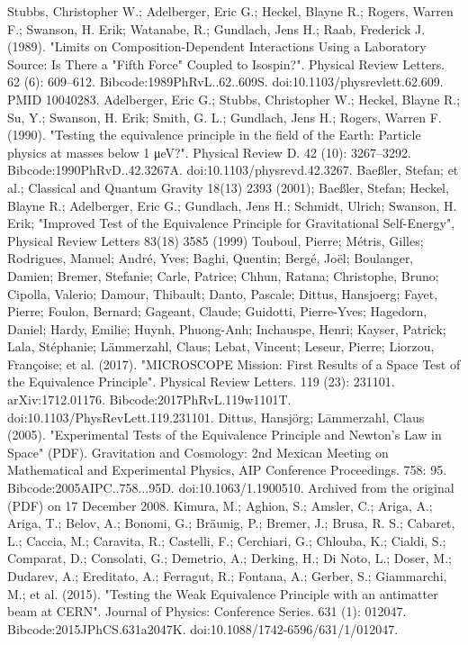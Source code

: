 \begin{enumerate}
Stubbs, Christopher W.; Adelberger, Eric G.; Heckel, Blayne R.; Rogers, Warren F.; Swanson, H. Erik; Watanabe, R.; Gundlach, Jens H.; Raab, Frederick J. (1989). "Limits on Composition-Dependent Interactions Using a Laboratory Source: Is There a "Fifth Force" Coupled to Isospin?". Physical Review Letters. 62 (6): 609–612. Bibcode:1989PhRvL..62..609S. doi:10.1103/physrevlett.62.609. PMID 10040283.
Adelberger, Eric G.; Stubbs, Christopher W.; Heckel, Blayne R.; Su, Y.; Swanson, H. Erik; Smith, G. L.; Gundlach, Jens H.; Rogers, Warren F. (1990). "Testing the equivalence principle in the field of the Earth: Particle physics at masses below 1 μeV?". Physical Review D. 42 (10): 3267–3292. Bibcode:1990PhRvD..42.3267A. doi:10.1103/physrevd.42.3267.
Baeßler, Stefan; et al.; Classical and Quantum Gravity 18(13) 2393 (2001); Baeßler, Stefan; Heckel, Blayne R.; Adelberger, Eric G.; Gundlach, Jens H.; Schmidt, Ulrich; Swanson, H. Erik; "Improved Test of the Equivalence Principle for Gravitational Self-Energy", Physical Review Letters 83(18) 3585 (1999)
Touboul, Pierre; Métris, Gilles; Rodrigues, Manuel; André, Yves; Baghi, Quentin; Bergé, Joël; Boulanger, Damien; Bremer, Stefanie; Carle, Patrice; Chhun, Ratana; Christophe, Bruno; Cipolla, Valerio; Damour, Thibault; Danto, Pascale; Dittus, Hansjoerg; Fayet, Pierre; Foulon, Bernard; Gageant, Claude; Guidotti, Pierre-Yves; Hagedorn, Daniel; Hardy, Emilie; Huynh, Phuong-Anh; Inchauspe, Henri; Kayser, Patrick; Lala, Stéphanie; Lämmerzahl, Claus; Lebat, Vincent; Leseur, Pierre; Liorzou, Françoise; et al. (2017). "MICROSCOPE Mission: First Results of a Space Test of the Equivalence Principle". Physical Review Letters. 119 (23): 231101. arXiv:1712.01176. Bibcode:2017PhRvL.119w1101T. doi:10.1103/PhysRevLett.119.231101.
Dittus, Hansjörg; Lāmmerzahl, Claus (2005). "Experimental Tests of the Equivalence Principle and Newton's Law in Space" (PDF). Gravitation and Cosmology: 2nd Mexican Meeting on Mathematical and Experimental Physics, AIP Conference Proceedings. 758: 95. Bibcode:2005AIPC..758...95D. doi:10.1063/1.1900510. Archived from the original (PDF) on 17 December 2008.
Kimura, M.; Aghion, S.; Amsler, C.; Ariga, A.; Ariga, T.; Belov, A.; Bonomi, G.; Bräunig, P.; Bremer, J.; Brusa, R. S.; Cabaret, L.; Caccia, M.; Caravita, R.; Castelli, F.; Cerchiari, G.; Chlouba, K.; Cialdi, S.; Comparat, D.; Consolati, G.; Demetrio, A.; Derking, H.; Di Noto, L.; Doser, M.; Dudarev, A.; Ereditato, A.; Ferragut, R.; Fontana, A.; Gerber, S.; Giammarchi, M.; et al. (2015). "Testing the Weak Equivalence Principle with an antimatter beam at CERN". Journal of Physics: Conference Series. 631 (1): 012047. Bibcode:2015JPhCS.631a2047K. doi:10.1088/1742-6596/631/1/012047.

\end{enumerate}
